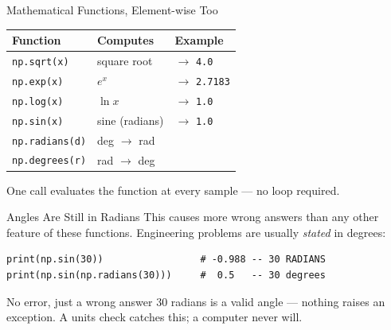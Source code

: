 \documentclass[9pt,aspectratio=169,xcolor=table]{beamer}
\newcommand{\striped}{\rowcolors{1}{white}{stripe}}
\begin{document}
\begin{frame}{Mathematical Functions, Element-wise Too}
    \leavevmode
    \small
    \striped
    \begin{center}
    \begin{tabular}{p{2.8cm}p{3.6cm}p{3.0cm}}
        \toprule
        \textbf{Function} & \textbf{Computes} & \textbf{Example} \\
        \midrule
        \texttt{np.sqrt(x)} & square root & $\to$ \texttt{4.0} \\
        \texttt{np.exp(x)}  & $e^x$ & $\to$ \texttt{2.7183} \\
        \texttt{np.log(x)}  & $\ln x$ & $\to$ \texttt{1.0} \\
        \texttt{np.sin(x)}  & sine (radians) & $\to$ \texttt{1.0} \\
        \texttt{np.radians(d)} & deg $\to$ rad & \\
        \texttt{np.degrees(r)} & rad $\to$ deg & \\
        \bottomrule
    \end{tabular}
    \end{center}

    \vspace{2mm}
    {\small One call evaluates the function at \alert{every} sample ---
    no loop required.}
\end{frame}

\begin{frame}[fragile]{Angles Are Still in Radians}
    \leavevmode
    This causes more wrong answers than any other feature of these
    functions. Engineering problems are usually \emph{stated} in
    degrees:

\begin{lstlisting}
print(np.sin(30))                 # -0.988 -- 30 RADIANS
print(np.sin(np.radians(30)))     #  0.5   -- 30 degrees
\end{lstlisting}

    \vspace{2mm}
    \begin{alertblock}{No error, just a wrong answer}
        $30$ radians is a valid angle --- nothing raises an exception.
        A units check catches this; a computer never will.
    \end{alertblock}
\end{frame}
\end{document}
